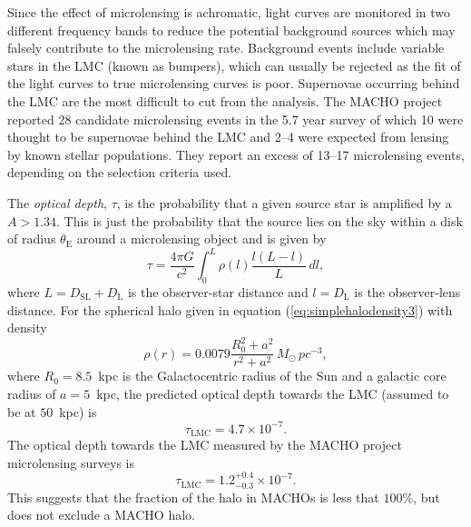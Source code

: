 Since the effect of microlensing is achromatic, light curves are monitored in
two different frequency bands to reduce the potential background sources
which may falsely contribute to the microlensing rate. Background events
include variable stars in the LMC (known as bumpers\cite{1996astro.ph..6165A}), 
which can usually be rejected as the fit of the light curves to true
microlensing curves is poor. Supernovae occurring behind the LMC are the most
difficult to cut from the analysis. The MACHO project reported 28 candidate
microlensing events in the 5.7 year survey of which 10 were thought to be
supernovae behind the LMC and 2--4 were expected from lensing by known stellar
populations.  They report an excess of 13--17 microlensing events, depending
on the selection criteria used.

The \emph{optical depth}, $\tau$, is the probability that a given source star
is amplified by a $A > 1.34$\cite{Paczynski:1985jf}. This is just the
probability that the source lies on the sky within a disk of radius
$\theta_\mathrm{E}$ around a microlensing object and is given
by\cite{Alcock:1995zx}
\begin{equation}
\tau = \frac{4\pi G}{c^2} \int_0^{L} \rho(l) \frac{l(L - l)}{L}\,dl,
\end{equation}
where $L = D_\mathrm{SL} + D_\mathrm{L}$ is the observer-star distance and $l
= D_\mathrm{L}$ is the observer-lens distance. For the spherical halo given in
equation (\ref{eq:simplehalodensity3}) with density
\begin{equation}
\rho(r) = 0.0079 \frac{R_0^2 + a^2}{r^2 + a^2} \,M_\odot\, pc^{-3},
\end{equation}
where $R_0 = 8.5$~kpc is the Galactocentric radius of the Sun and a galactic
core radius of $a = 5$~kpc, the predicted optical depth towards the LMC
(assumed to be at $50$~kpc) is\cite{Alcock:1995zx}
\begin{equation}
\tau_\mathrm{LMC} = 4.7 \times 10^{-7}.
\end{equation}
The optical depth towards the LMC measured by the MACHO project microlensing
surveys is
\begin{equation}
\tau_\mathrm{LMC} = 1.2_{-0.3}^{+0.4} \times 10^{-7}.
\end{equation}
This suggests that the fraction of the halo in MACHOs is less that $100\%$,
but does not exclude a MACHO halo.

